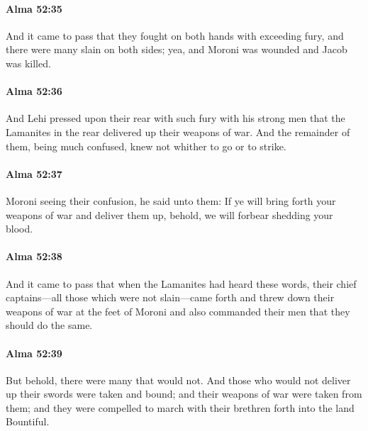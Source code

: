 		\paragraph{Alma 52:35} %
			\label{ALMA-52-35}

			And it came to pass that they fought on both hands with exceeding fury,
			and there were many slain on both sides;
			yea, and Moroni was wounded and Jacob was killed.

		\paragraph{Alma 52:36} %
			\label{ALMA-52-36}

			And Lehi pressed upon their rear with such fury with his strong men
			that the Lamanites in the rear delivered up their weapons of war.
			And the remainder of them, being much confused,
			knew not whither to go or to strike.

		\paragraph{Alma 52:37} %
			\label{ALMA-52-37}

			Moroni seeing their confusion, he said unto them:
			If ye will bring forth your weapons of war and deliver them up,
			behold, we will forbear shedding your blood.

		\paragraph{Alma 52:38} %
			\label{ALMA-52-38}

			And it came to pass that when the Lamanites had heard these words,
			their chief captains---all those which were not slain---came forth
			and threw down their weapons of war at the feet of Moroni
			and also commanded their men that they should do the same.

		\paragraph{Alma 52:39} %
			\label{ALMA-52-39}

			But behold, there were many that would not.
			And those who would not deliver up their swords were taken and bound;
			and their weapons of war were taken from them;
			and they were compelled to march with their brethren forth into the land Bountiful.

